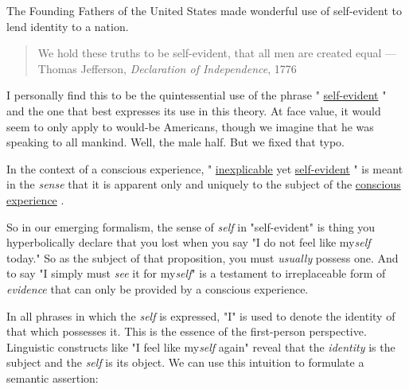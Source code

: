 \documentclass[runningheads]{llncs}
\newcommand{\link}[2]{%
\href{#1}{\textcolor{wikiblue}{#2}\xspace}%
}
\newcommand{\repo}[2]{%
\link{https://github.com/DNA-Platform/inexplicable-phenomena/blob/main/#1}{#2}\xspace%
}
\newcommand{\consciousExperience}[0]{%
\repo{research/consciousness/a-novel-perspective-on-vision.md}{conscious experience}%
}
\newcommand{\inexplicable}[0]{%
\repo{research/consciousness/a-novel-perspective-on-vision.md}{inexplicable}%
}
\newcommand{\selfEvident}[0]{%
\repo{research/consciousness/a-novel-perspective-on-vision.md}{self-evident}%
}
\begin{document}
The Founding Fathers of the United States made wonderful use of self-evident to lend identity to a nation.

\begin{quote}
We hold these truths to be self-evident, that all men are created equal --- Thomas Jefferson, \emph{Declaration of Independence}, 1776
\end{quote}

I personally find this to be the quintessential use of the phrase "\selfEvident" and the one that best expresses its use in this theory. At face value, it would seem to only apply to would-be Americans, though we imagine that he was speaking to all mankind. Well, the male half. But we fixed that typo.

In the context of a conscious experience, "\inexplicable \space yet \selfEvident" is meant in the \emph{sense} that it is apparent only and uniquely to the subject of the \consciousExperience. 

So in our emerging formalism, the sense of \emph{self} in "self-evident" is thing you hyperbolically declare that you lost when you say "I do not feel like my\emph{self} today." So as the subject of that proposition, you must \emph{usually} possess one. And to say "I simply must \emph{see} it for my\emph{self}" is a testament to irreplaceable form of \emph{evidence} that can only be provided by a conscious experience.

In all phrases in which the \emph{self} is expressed, "I" is used to denote the identity of that which possesses it. This is the essence of the first-person perspective. Linguistic constructs like "I feel like my\emph{self} again" reveal that the \emph{identity} is the subject and the \emph{self} is its object. We can use this intuition to formulate a semantic assertion:
\end{document}
